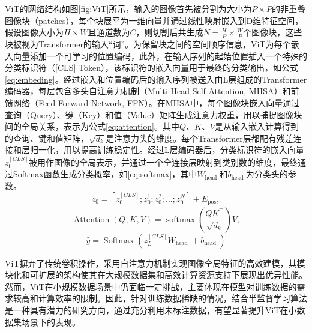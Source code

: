 \documentclass[lang=chs, degree=master, blindreview=false, adobe=false]{yanputhesis}
\begin{document}
ViT的网络结构如图\ref{fig:ViT}所示，输入的图像首先被分割为大小为$P\times P$的非重叠图像块（patches），每个块展平为一维向量并通过线性映射嵌入到D维特征空间，假设图像大小为$H \times W$且通道数为$C$，则切割后共生成$N=\frac{H}{P} \times \frac{W}{P}$个图像块，这些块被视为Transformer的输入“词”。为保留块之间的空间顺序信息，ViT为每个嵌入向量添加一个可学习的位置编码，此外，在输入序列的起始位置插入一个特殊的分类标识符（[CLS] Token），该标识符的嵌入向量用于最终的分类输出，如公式\ref{eq:embeding}。经过嵌入和位置编码后的输入序列被送入由L层组成的Transformer编码器，每层包含多头自注意力机制（Multi-Head Self-Attention, MHSA）和前馈网络（Feed-Forward Network, FFN）。在MHSA中，每个图像块嵌入向量通过查询（Query）、键（Key）和值（Value）矩阵生成注意力权重，用以捕捉图像块间的全局关系，表示为公式\ref{eq:attention}。其中$Q$、$K$、$V$是从输入嵌入计算得到的查询、键和值矩阵，$\sqrt{d_{k}}$是注意力头的维度。每个Transformer层都配有残差连接和层归一化，用以提高训练稳定性。经过L层编码器后，分类标识符的嵌入向量$z_{0}^{[C L S]}$被用作图像的全局表示，并通过一个全连接层映射到类别数的维度，最终通过Softmax函数生成分类概率，如\autoref{eq:softmax}，其中$W_{\text {head }}$和$b_{\text {head }}$为分类头的参数。
\begin{equation}
  \label{eq:embeding}
  z_{0}=\left[z_{0}^{[C L S]} ; z_{0}^{1} ; z_{0}^{2} ; \ldots ; z_{0}^{N}\right]+E_{\mathrm{pos}},
\end{equation}
\begin{equation}
  \label{eq:attention}
\operatorname{Attention}(Q, K, V)=\operatorname{softmax}\left(\frac{Q K^{\top}}{\sqrt{d_{k}}}\right) V,
\end{equation}
\begin{equation}
  \label{eq:softmax}
  \hat{y}=\operatorname{Softmax}\left(z_{L}^{[C L S]} W_{\text {head }}+b_{\text {head }}\right)
\end{equation}

ViT摒弃了传统卷积操作，采用自注意力机制实现图像全局特征的高效建模，其模块化和可扩展的架构使其在大规模数据集和高效计算资源支持下展现出优异性能。然而，ViT在小规模数据场景中仍面临一定挑战，主要体现在模型对训练数据的需求较高和计算效率的限制。因此，针对训练数据稀缺的情况，结合半监督学习算法是一种具有潜力的研究方向，通过充分利用未标注数据，有望显著提升ViT在小数据集场景下的表现。
\end{document}
